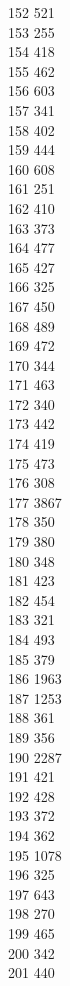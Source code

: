 { 152	521 \\
 153	255 \\
 154	418 \\
 155	462 \\
 156	603 \\
 157	341 \\
 158	402 \\
 159	444 \\
 160	608 \\
 161	251 \\
 162	410 \\
 163	373 \\
 164	477 \\
 165	427 \\
 166	325 \\
 167	450 \\
 168	489 \\
 169	472 \\
 170	344 \\
 171	463 \\
 172	340 \\
 173	442 \\
 174	419 \\
 175	473 \\
 176	308 \\
 177	3867 \\
 178	350 \\
 179	380 \\
 180	348 \\
 181	423 \\
 182	454 \\
 183	321 \\
 184	493 \\
 185	379 \\
 186	1963 \\
 187	1253 \\
 188	361 \\
 189	356 \\
 190	2287 \\
 191	421 \\
 192	428 \\
 193	372 \\
 194	362 \\
 195	1078 \\
 196	325 \\
 197	643 \\
 198	270 \\
 199	465 \\
 200	342 \\
 201	440 \\
}
